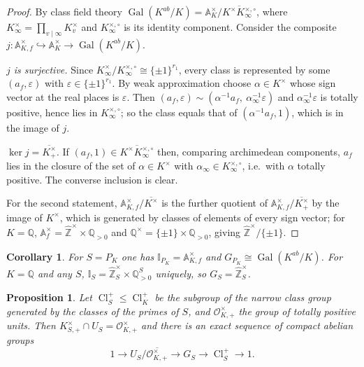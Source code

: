 \documentclass[11pt]{amsart}
\numberwithin{equation}{section}
\newtheorem{proposition}[theorem]{Proposition}
\newtheorem{corollary}[theorem]{Corollary}
\theoremstyle{definition}
\theoremstyle{remark}
\newcommand{\Z}{\mathbb{Z}}
\newcommand{\Q}{\mathbb{Q}}
\newcommand{\A}{\mathbb{A}}
\newcommand{\hZ}{\widehat{\Z}}
\newcommand{\Gal}{\operatorname{Gal}}
\newcommand{\Cl}{\operatorname{Cl}}
\newcommand{\cO}{\mathcal{O}}
\newcommand{\Idl}{\mathbb{I}}
\begin{document}
\begin{proof}
By class field theory $\Gal(K^{ab}/K)=\A_K^\times/\overline{K^\times K_\infty^{\times,\circ}}$,
where $K_\infty^\times=\prod_{v\mid\infty}K_v^\times$ and $K_\infty^{\times,\circ}$
is its identity component. Consider the composite
$j:\A_{K,f}^\times\hookrightarrow\A_K^\times\to\Gal(K^{ab}/K)$.

\emph{$j$ is surjective.} Since $K_\infty^\times/K_\infty^{\times,\circ}\cong\{\pm1\}^{r_1}$,
every class is represented by some $(a_f,\varepsilon)$ with
$\varepsilon\in\{\pm1\}^{r_1}$. By weak approximation choose
$\alpha\in K^\times$ whose sign vector at the real places is $\varepsilon$.
Then $(a_f,\varepsilon)\sim(\alpha^{-1}a_f,\ \alpha_\infty^{-1}\varepsilon)$
and $\alpha_\infty^{-1}\varepsilon$ is totally positive, hence lies in
$K_\infty^{\times,\circ}$; so the class equals that of $(\alpha^{-1}a_f,1)$,
which is in the image of $j$.

\emph{$\ker j=\overline{K^\times_+}$.} If $(a_f,1)\in\overline{K^\times K_\infty^{\times,\circ}}$
then, comparing archimedean components, $a_f$ lies in the closure of the set of
$\alpha\in K^\times$ with $\alpha_\infty\in K_\infty^{\times,\circ}$, i.e.\ with
$\alpha$ totally positive. The converse inclusion is clear.

For the second statement, $\A_{K,f}^\times/\overline{K^\times}$ is the further
quotient of $\A_{K,f}^\times/\overline{K^\times_+}$ by the image of $K^\times$,
which is generated by classes of elements of every sign vector; for $K=\Q$,
$\A_f^\times=\hZ^\times\times\Q_{>0}$ and $\Q^\times=\{\pm1\}\times\Q_{>0}$,
giving $\hZ^\times/\{\pm1\}$.
\end{proof}

\begin{corollary}\label{cor:GSfull}
For $S=P_K$ one has $\Idl_{P_K}=\A_{K,f}^\times$ and
$G_{P_K}\cong\Gal(K^{ab}/K)$. For $K=\Q$ and any $S$,
$\Idl_S=\hZ_S^\times\times\Q^S_{>0}$ uniquely, so $G_S=\hZ_S^\times$.
\end{corollary}

\begin{proposition}\label{prop:GSstructure}
Let $\Cl^+_S\le\Cl^+_K$ be the subgroup of the narrow class group generated by
the classes of the primes of $S$, and $\cO^\times_{K,+}$ the group of totally
positive units. Then $K^\times_{S,+}\cap U_S=\cO^\times_{K,+}$ and there is an
exact sequence of compact abelian groups
\begin{equation}\label{eq:exact}
1\longrightarrow U_S\big/\overline{\cO^\times_{K,+}}\longrightarrow G_S\longrightarrow\Cl^+_S\longrightarrow1 .
\end{equation}
\end{proposition}
\end{document}
